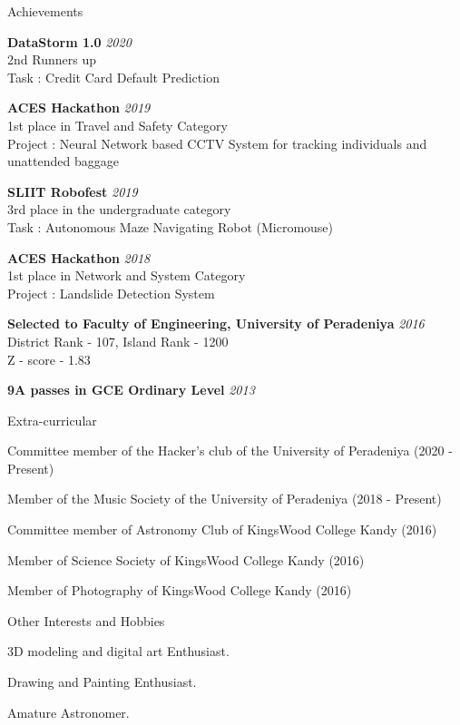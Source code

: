 \documentclass{resume} %
\begin{document}
\begin{rSection}{Achievements}

{\bf DataStorm 1.0} \hfill {\em 2020}
\\2nd Runners up
\\Task : Credit Card Default Prediction


{\bf ACES Hackathon} \hfill {\em 2019}
\\1st place in Travel and Safety Category
\\Project : Neural Network based CCTV System for tracking individuals and unattended baggage

{\bf SLIIT Robofest} \hfill {\em 2019}
\\3rd place in the undergraduate category
\\Task : Autonomous Maze Navigating Robot (Micromouse)

{\bf ACES Hackathon} \hfill {\em 2018}
\\1st place in Network and System Category
\\Project : Landslide Detection System

{\bf Selected to Faculty of Engineering, University of Peradeniya} \hfill {\em 2016}
\\District Rank - 107,  Island Rank - 1200
\\Z - score - 1.83

{\bf 9A passes in GCE Ordinary Level} \hfill {\em 2013} 
\end{rSection}


\begin{rSection}{Extra-curricular} \itemsep -3pt
\item Committee member of the Hacker's club of the University of Peradeniya (2020 - Present)
\item Member of the Music Society of the University of Peradeniya (2018 - Present)
\item Committee member of Astronomy Club of KingsWood College Kandy (2016)
\item Member of Science Society of KingsWood College Kandy (2016)
\item Member of Photography of KingsWood College Kandy (2016)

 
\end{rSection}

\clearpage
\begin{rSection}{Other Interests and Hobbies} \itemsep -3pt
\item 3D modeling and digital art Enthusiast.
\item Drawing and Painting Enthusiast.
\item Amature Astronomer.


\end{rSection}
\end{document}
